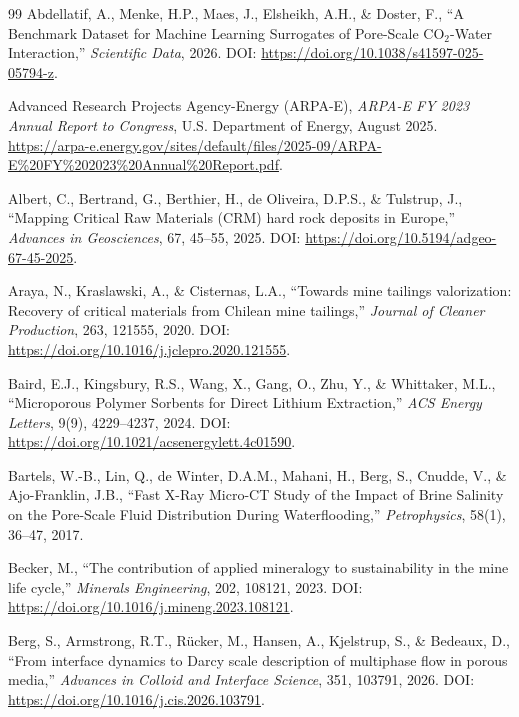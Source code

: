 \documentclass[12pt,a4paper]{article}
\begin{document}
\begin{thebibliography}{99}
Abdellatif, A., Menke, H.P., Maes, J., Elsheikh, A.H., \& Doster, F., ``A Benchmark Dataset for Machine Learning Surrogates of Pore-Scale CO$_2$-Water Interaction,'' \textit{Scientific Data}, 2026. DOI: \url{https://doi.org/10.1038/s41597-025-05794-z}.

Advanced Research Projects Agency-Energy (ARPA-E), \textit{ARPA-E FY 2023 Annual Report to Congress}, U.S. Department of Energy, August 2025. \url{https://arpa-e.energy.gov/sites/default/files/2025-09/ARPA-E%20FY%202023%20Annual%20Report.pdf}.

Albert, C., Bertrand, G., Berthier, H., de Oliveira, D.P.S., \& Tulstrup, J., ``Mapping Critical Raw Materials (CRM) hard rock deposits in Europe,'' \textit{Advances in Geosciences}, 67, 45--55, 2025. DOI: \url{https://doi.org/10.5194/adgeo-67-45-2025}.

Araya, N., Kraslawski, A., \& Cisternas, L.A., ``Towards mine tailings valorization: Recovery of critical materials from Chilean mine tailings,'' \textit{Journal of Cleaner Production}, 263, 121555, 2020. DOI: \url{https://doi.org/10.1016/j.jclepro.2020.121555}.

Baird, E.J., Kingsbury, R.S., Wang, X., Gang, O., Zhu, Y., \& Whittaker, M.L., ``Microporous Polymer Sorbents for Direct Lithium Extraction,'' \textit{ACS Energy Letters}, 9(9), 4229--4237, 2024. DOI: \url{https://doi.org/10.1021/acsenergylett.4c01590}.

Bartels, W.-B., Lin, Q., de Winter, D.A.M., Mahani, H., Berg, S., Cnudde, V., \& Ajo-Franklin, J.B., ``Fast X-Ray Micro-CT Study of the Impact of Brine Salinity on the Pore-Scale Fluid Distribution During Waterflooding,'' \textit{Petrophysics}, 58(1), 36--47, 2017.

Becker, M., ``The contribution of applied mineralogy to sustainability in the mine life cycle,'' \textit{Minerals Engineering}, 202, 108121, 2023. DOI: \url{https://doi.org/10.1016/j.mineng.2023.108121}.

Berg, S., Armstrong, R.T., Rücker, M., Hansen, A., Kjelstrup, S., \& Bedeaux, D., ``From interface dynamics to Darcy scale description of multiphase flow in porous media,'' \textit{Advances in Colloid and Interface Science}, 351, 103791, 2026. DOI: \url{https://doi.org/10.1016/j.cis.2026.103791}.


\end{thebibliography}
\end{document}
